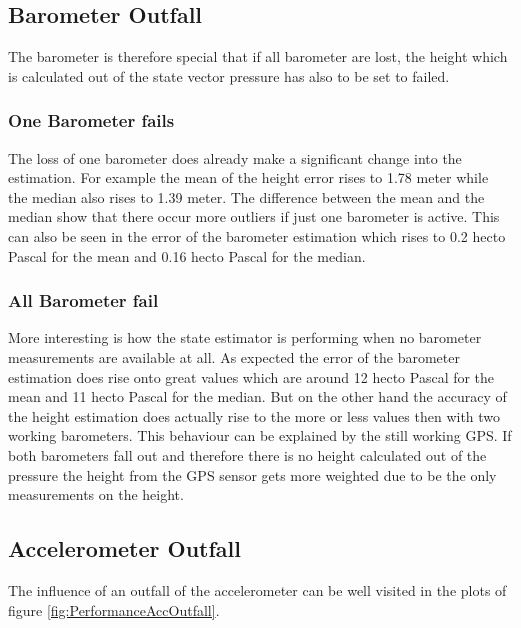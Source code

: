 \subsection{Barometer Outfall}
The barometer is therefore special that if all barometer are lost, 
the height which is calculated out of the state vector pressure has also to be set to failed.

\subsubsection{One Barometer fails}
The loss of one barometer does already make a significant change into the estimation.
For example the mean of the height error rises to 1.78 meter while the median also rises to 1.39 meter.
The difference between the mean and the median show that there occur more outliers if just one barometer is active.
This can also be seen in the error of the barometer estimation which rises to 0.2 hecto Pascal for the mean and 0.16 hecto Pascal for the median.

\subsubsection{All Barometer fail}
More interesting is how the state estimator is performing when no barometer measurements are available at all.
As expected the error of the barometer estimation does rise onto great values which are around 12 hecto Pascal for the mean and 11 hecto Pascal for the median.
But on the other hand the accuracy of the height estimation does actually rise to the more or less values then with two working barometers.
This behaviour can be explained by the still working GPS.
If both barometers fall out and therefore there is no height calculated out of the pressure the height from the 
GPS sensor gets more weighted due to be the only measurements on the height.

\newpage
\subsection{Accelerometer Outfall}
The influence of an outfall of the accelerometer can be well visited in the plots of figure \ref{fig:PerformanceAccOutfall}.

